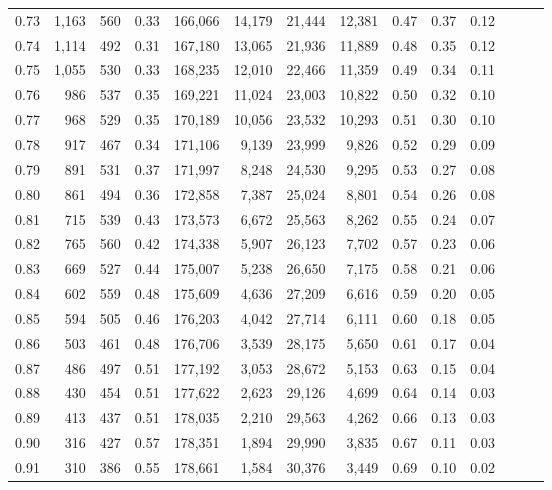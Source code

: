 \begin{tabular}{rrrrrrrrrrrrrr}
0.73 &  1,163 &  560 &  0.33 &  166,066 &   14,179 &  21,444 &  12,381 &  0.47 &  0.37 &      0.12 \\
0.74 &  1,114 &  492 &  0.31 &  167,180 &   13,065 &  21,936 &  11,889 &  0.48 &  0.35 &      0.12 \\
0.75 &  1,055 &  530 &  0.33 &  168,235 &   12,010 &  22,466 &  11,359 &  0.49 &  0.34 &      0.11 \\
0.76 &    986 &  537 &  0.35 &  169,221 &   11,024 &  23,003 &  10,822 &  0.50 &  0.32 &      0.10 \\
0.77 &    968 &  529 &  0.35 &  170,189 &   10,056 &  23,532 &  10,293 &  0.51 &  0.30 &      0.10 \\
0.78 &    917 &  467 &  0.34 &  171,106 &    9,139 &  23,999 &   9,826 &  0.52 &  0.29 &      0.09 \\
0.79 &    891 &  531 &  0.37 &  171,997 &    8,248 &  24,530 &   9,295 &  0.53 &  0.27 &      0.08 \\
0.80 &    861 &  494 &  0.36 &  172,858 &    7,387 &  25,024 &   8,801 &  0.54 &  0.26 &      0.08 \\
0.81 &    715 &  539 &  0.43 &  173,573 &    6,672 &  25,563 &   8,262 &  0.55 &  0.24 &      0.07 \\
0.82 &    765 &  560 &  0.42 &  174,338 &    5,907 &  26,123 &   7,702 &  0.57 &  0.23 &      0.06 \\
0.83 &    669 &  527 &  0.44 &  175,007 &    5,238 &  26,650 &   7,175 &  0.58 &  0.21 &      0.06 \\
0.84 &    602 &  559 &  0.48 &  175,609 &    4,636 &  27,209 &   6,616 &  0.59 &  0.20 &      0.05 \\
0.85 &    594 &  505 &  0.46 &  176,203 &    4,042 &  27,714 &   6,111 &  0.60 &  0.18 &      0.05 \\
0.86 &    503 &  461 &  0.48 &  176,706 &    3,539 &  28,175 &   5,650 &  0.61 &  0.17 &      0.04 \\
0.87 &    486 &  497 &  0.51 &  177,192 &    3,053 &  28,672 &   5,153 &  0.63 &  0.15 &      0.04 \\
0.88 &    430 &  454 &  0.51 &  177,622 &    2,623 &  29,126 &   4,699 &  0.64 &  0.14 &      0.03 \\
0.89 &    413 &  437 &  0.51 &  178,035 &    2,210 &  29,563 &   4,262 &  0.66 &  0.13 &      0.03 \\
0.90 &    316 &  427 &  0.57 &  178,351 &    1,894 &  29,990 &   3,835 &  0.67 &  0.11 &      0.03 \\
0.91 &    310 &  386 &  0.55 &  178,661 &    1,584 &  30,376 &   3,449 &  0.69 &  0.10 &      0.02 \\

\end{tabular}
